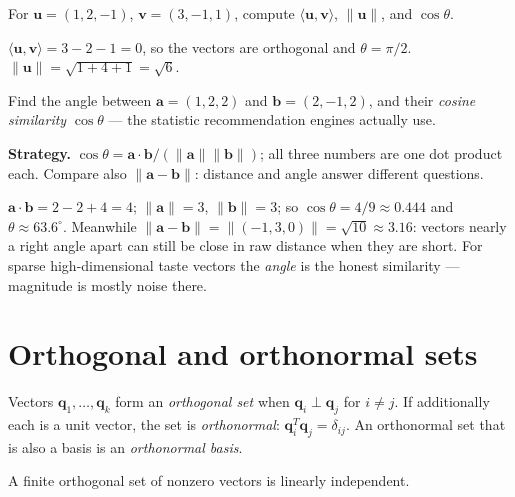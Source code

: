 \begin{exercise}[easy]\label{ex:orth-1}
For $\mathbf u=(1,2,-1)$, $\mathbf v=(3,-1,1)$, compute $\langle\mathbf u,\mathbf v\rangle$,
$\|\mathbf u\|$, and $\cos\theta$.
\begin{solution}
$\langle\mathbf u,\mathbf v\rangle=3-2-1=0$, so the vectors are orthogonal and
$\theta=\pi/2$. $\|\mathbf u\|=\sqrt{1+4+1}=\sqrt6$.
\end{solution}
\end{exercise}

\begin{example}\label{ex:cossim}
Find the angle between $\mathbf{a}=(1,2,2)$ and
$\mathbf{b}=(2,-1,2)$, and their \emph{cosine similarity}
$\cos\theta$ --- the statistic recommendation engines actually
use.
\par\smallskip
\textbf{Strategy.} $\cos\theta=\mathbf a\cdot\mathbf b/
(\|\mathbf a\|\|\mathbf b\|)$; all three numbers are one dot product
each. Compare also $\|\mathbf a-\mathbf b\|$: distance and angle answer
different questions.
\begin{solution}
$\mathbf a\cdot\mathbf b=2-2+4=4$; $\|\mathbf a\|=3$,
$\|\mathbf b\|=3$; so $\cos\theta=4/9\approx0.444$ and
$\theta\approx63.6^\circ$. Meanwhile $\|\mathbf a-\mathbf
b\|=\|(-1,3,0)\|=\sqrt{10}\approx3.16$: vectors nearly a right angle
apart can still be close in raw distance when they are short. For
sparse high-dimensional taste vectors the \emph{angle} is the honest
similarity --- magnitude is mostly noise there. \checkmark
\end{solution}
\end{example}

\section{Orthogonal and orthonormal sets}\label{sec:orth-sets}

\begin{definition}
Vectors $\mathbf q_1,\dots,\mathbf q_k$ form an \emph{orthogonal set} when
$\mathbf q_i\perp\mathbf q_j$ for $i\ne j$. If additionally each is a unit
vector, the set is \emph{orthonormal}: $\mathbf q_i^{T}\mathbf q_j=\delta_{ij}$.
An orthonormal set that is also a basis is an \emph{orthonormal basis}.
\end{definition}

\begin{theorem}\label{th:orth-indep}
A finite orthogonal set of nonzero vectors is linearly independent.
\end{theorem}

